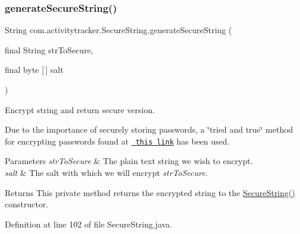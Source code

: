 \subsubsection{\texorpdfstring{generateSecureString()}{generateSecureString()}}
{\footnotesize\ttfamily String com.\+activitytracker.\+Secure\+String.\+generate\+Secure\+String (\begin{DoxyParamCaption}\item[{final String}]{str\+To\+Secure,  }\item[{final byte \mbox{[}$\,$\mbox{]}}]{salt }\end{DoxyParamCaption})\hspace{0.3cm}{\ttfamily [private]}}

Encrypt string and return secure version.

Due to the importance of securely storing passwords, a \char`\"{}tried and true\char`\"{} method for encrypting passwords found at \href{https://howtodoinjava.com/security/how-to-generate-secure-password-hash-md5-sha-pbkdf2-bcrypt-examples/}{\texttt{ this link}} has been used.


\begin{DoxyParams}{Parameters}
{\em str\+To\+Secure} & The plain text string we wish to encrypt. \\
\hline
{\em salt} & The salt with which we will encrypt {\itshape str\+To\+Secure}.\\
\hline
\end{DoxyParams}
\begin{DoxyReturn}{Returns}
This private method returns the encrypted string to the \mbox{\hyperlink{classcom_1_1activitytracker_1_1_secure_string_a889fcbf0c1f771962ac81886f49e389e}{Secure\+String()}} constructor. 
\end{DoxyReturn}


Definition at line 102 of file Secure\+String.\+java.


